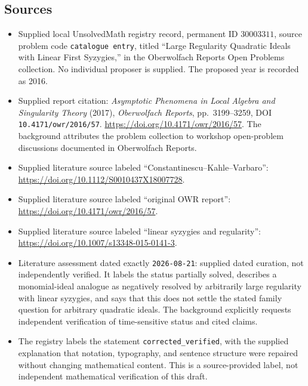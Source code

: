 \documentclass[11pt]{article}
\begin{document}
\subsection{Sources}
\begin{itemize}
\item Supplied local UnsolvedMath registry record, permanent ID \(30003311\), source problem code \texttt{catalogue entry}, titled ``Large Regularity Quadratic Ideals with Linear First Syzygies,'' in the Oberwolfach Reports Open Problems collection. No individual proposer is supplied. The proposed year is recorded as 2016.
\item Supplied report citation: \emph{Asymptotic Phenomena in Local Algebra and Singularity Theory} (2017), \emph{Oberwolfach Reports}, pp.\ 3199--3259, DOI \texttt{10.4171/owr/2016/57}. \url{https://doi.org/10.4171/owr/2016/57}. The background attributes the problem collection to workshop open-problem discussions documented in Oberwolfach Reports.
\item Supplied literature source labeled ``Constantinescu--Kahle--Varbaro'': \url{https://doi.org/10.1112/S0010437X18007728}.
\item Supplied literature source labeled ``original OWR report'': \url{https://doi.org/10.4171/owr/2016/57}.
\item Supplied literature source labeled ``linear syzygies and regularity'': \url{https://doi.org/10.1007/s13348-015-0141-3}.
\item Literature assessment dated exactly \texttt{2026-08-21}: supplied dated curation, not independently verified. It labels the status partially solved, describes a monomial-ideal analogue as negatively resolved by arbitrarily large regularity with linear syzygies, and says that this does not settle the stated family question for arbitrary quadratic ideals. The background explicitly requests independent verification of time-sensitive status and cited claims.
\item The registry labels the statement \texttt{corrected\_verified}, with the supplied explanation that notation, typography, and sentence structure were repaired without changing mathematical content. This is a source-provided label, not independent mathematical verification of this draft.
\end{itemize}
\end{document}
